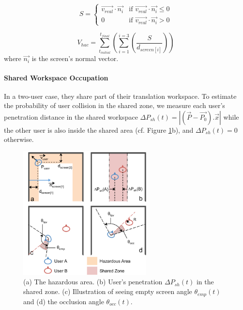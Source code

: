 \begin{equation}
S = 
  \begin{cases}
  \overrightarrow{v_{real}}\cdot\overrightarrow{n_{i}} & \text{if } \overrightarrow{v_{real}}\cdot\overrightarrow{n_{i}} \leq 0 \\
  0 & \text{if } \overrightarrow{v_{real}}\cdot\overrightarrow{n_{i}} > 0
  \end{cases}
\end{equation}

\begin{equation}
V_{hac}=\sum_{t_{initial}}^{t_{final}}\left(\sum_{i=1}^{i=3}\left(\frac{S}{d_{screen[i]}}\right)\right)
\end{equation}
where $\overrightarrow{n_{i}}$ is the screen's normal vector.


\paragraph{\textbf{Shared Workspace Occupation}}
In a two-user case, they share part of their translation workspace. To estimate the probability of user collision in the shared zone, we measure each user's penetration distance in the shared workspace $\Delta P_{sh}(t)=\left|(\overrightarrow{P}-\overrightarrow{P_{0}}).\overrightarrow{x}\right|$ while the other user is also inside the shared area (cf. Figure \ref{fig:3_metrics}b), and $\Delta P_{sh}(t)=0$ otherwise.

\begin{figure}[tb]
  \centering
  \includegraphics[width=0.6\textwidth]{figures/3_cohab_metrics}
  \caption{\label{fig:3_metrics}(a) The hazardous area. (b) User's penetration $\Delta P_{sh}(t)$ in the shared zone. (c) Illustration of seeing empty screen angle $\theta_{emp}(t)$ and (d) the occlusion angle $\theta_{occ}(t)$.}
\end{figure}

